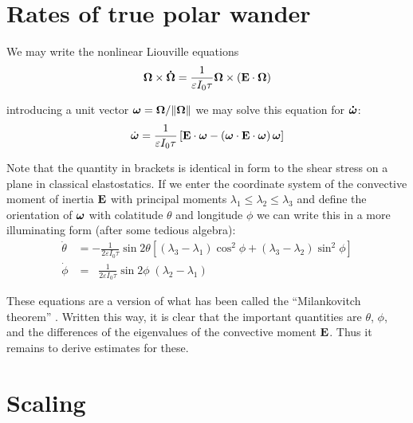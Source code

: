 \documentclass[extra]{gji}
\begin{document}
\section{Rates of true polar wander}

We may write the nonlinear Liouville equations 
\begin{equation}
{\bf \Omega} \times {\bf \dot{\Omega} } = \frac{1}{\varepsilon I_0 \tau} {\bf \Omega} \times \left( {\bf E \cdot \Omega} \right)
\end{equation}

introducing a unit vector $\mitbf{\omega} = {\bf \Omega}/\|{\bf \Omega} \|$ we may solve this equation for ${\bf \dot{\mitbf{\omega}} }$:
\begin{equation}
 \dot{\mitbf{\omega}}  = \frac{1}{\varepsilon I_0 \tau} \left[ {\bf E \cdot \mitbf{\omega}} - \left( {\bf \mitbf{\omega} \cdot E \cdot \mitbf{\omega} } \right) \mitbf{\omega} \right]
\end{equation}

Note that the quantity in brackets is identical in form to the shear stress on a plane in classical elastostatics.
If we enter the coordinate system of the convective moment of inertia $\bf E$ with principal moments $\lambda_1 \le \lambda_2 \le \lambda_3$ and define the orientation of $\mitbf{\omega}$ with colatitude $\theta$ and longitude $\phi$ we can write this in a more illuminating form (after some tedious algebra):
\begin{equation}
\begin{aligned}
\dot{\theta} &= - \frac{1}{2 \varepsilon I_0 \tau} \sin{2 \theta} \left[ (\lambda_3-\lambda_1) \cos^2{\phi} + (\lambda_3-\lambda_2) \sin^2{\phi} \right] \\
\dot{\phi} &= \;\; \frac{1}{2 \varepsilon I_0 \tau} \sin{2 \phi} \; (\lambda_2 - \lambda_1)
\end{aligned}
\label{milankovitch}
\end{equation}


These equations are a version of what has been called the ``Milankovitch theorem'' \citep{munk1960rotation}.  
Written this way, it is clear that the important quantities are $\theta$, $\phi$, and the differences of the eigenvalues of the convective moment $\bf E$.
Thus it remains to derive estimates for these.

\section{Scaling}
\end{document}
